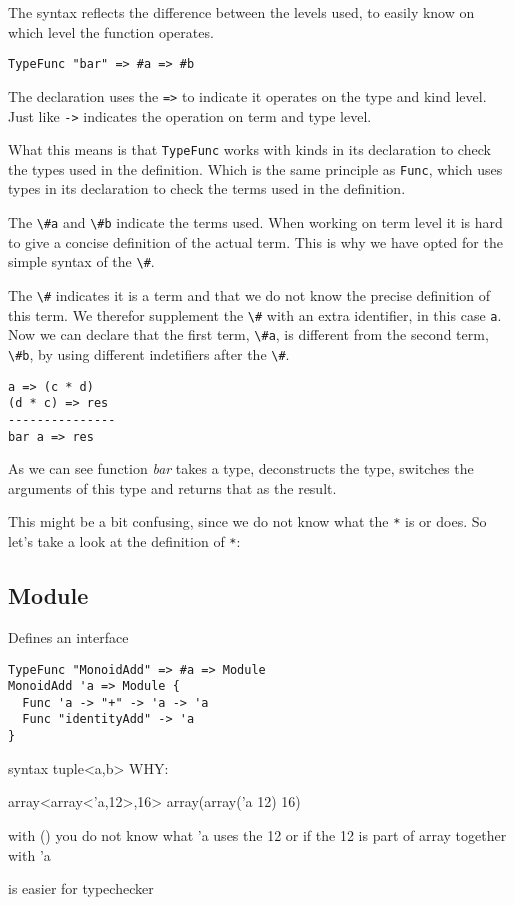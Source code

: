 The syntax reflects the difference between the levels used, to easily know on which level the function operates.

\begin{lstlisting}
TypeFunc "bar" => #a => #b
\end{lstlisting}

The declaration uses the \verb|=>| to indicate it operates on the type and kind level.
Just like \verb|->| indicates the operation on term and type level.

What this means is that \verb|TypeFunc| works with kinds in its declaration to check the types used in the definition.
Which is the same principle as \verb|Func|, which uses types in its declaration to check the terms used in the definition.

The \verb|\#a| and \verb|\#b| indicate the terms used.
When working on term level it is hard to give a concise definition of the actual term.
This is why we have opted for the simple syntax of the \verb|\#|.

The \verb|\#| indicates it is a term and that we do not know the precise definition of this term.
We therefor supplement the \verb|\#| with an extra identifier, in this case \verb|a|.
Now we can declare that the first term, \verb|\#a|, is different from the second term, \verb|\#b|, by using different indetifiers after the \verb|\#|.

\begin{lstlisting}
a => (c * d)
(d * c) => res
---------------
bar a => res
\end{lstlisting}

As we can see function \emph{bar} takes a type, deconstructs the type, switches the arguments of this type and returns that as the result.

This might be a bit confusing, since we do not know what the \verb|*| is or does.
So let's take a look at the definition of \verb|*|:




\subsection{Module}
Defines an interface
\begin{lstlisting}
TypeFunc "MonoidAdd" => #a => Module
MonoidAdd 'a => Module {
  Func 'a -> "+" -> 'a -> 'a
  Func "identityAdd" -> 'a
}
\end{lstlisting}




syntax tuple<a,b> WHY:

array<array<'a,12>,16>
array(array('a 12) 16)

with () you do not know what 'a uses the 12 or if the 12 is part of array together with 'a

is easier for typechecker
